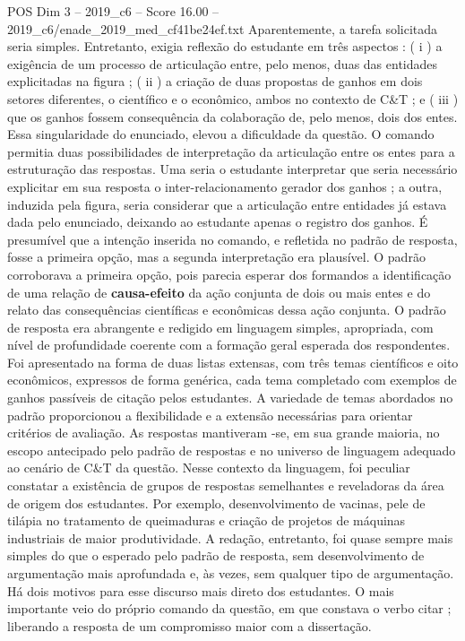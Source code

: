 \begin{textsample}{POS Dim 3 – 2019\_c6 – Score 16.00 – 2019\_c6/enade\_2019\_med\_cf41be24ef.txt}
Aparentemente, a tarefa solicitada seria simples.
Entretanto, exigia reflexão do estudante em três aspectos : ( i ) a exigência de um processo de articulação entre, pelo menos, duas das entidades explicitadas na figura ; ( ii ) a criação de duas propostas de ganhos em dois setores diferentes, o científico e o econômico, ambos no contexto de C\&T ; e ( iii ) que os ganhos fossem consequência da colaboração de, pelo menos, dois dos entes.
Essa singularidade do enunciado, elevou a dificuldade da questão.
O comando permitia duas possibilidades de interpretação da articulação entre os entes para a estruturação das respostas.
Uma seria o estudante interpretar que seria necessário explicitar em sua resposta o inter-relacionamento gerador dos ganhos ; a outra, induzida pela figura, seria considerar que a articulação entre entidades já estava dada pelo enunciado, deixando ao estudante apenas o registro dos ganhos.
É presumível que a intenção inserida no comando, e refletida no padrão de resposta, fosse a primeira opção, mas a segunda interpretação era plausível.
O padrão corroborava a primeira opção, pois parecia esperar dos formandos a identificação de uma relação de \textbf{causa-efeito} da ação conjunta de dois ou mais entes e do relato das consequências científicas e econômicas dessa ação conjunta.
O padrão de resposta era abrangente e redigido em linguagem simples, apropriada, com nível de profundidade coerente com a formação geral esperada dos respondentes.
Foi apresentado na forma de duas listas extensas, com três temas científicos e oito econômicos, expressos de forma genérica, cada tema completado com exemplos de ganhos passíveis de citação pelos estudantes.
A variedade de temas abordados no padrão proporcionou a flexibilidade e a extensão necessárias para orientar critérios de avaliação.
As respostas mantiveram -se, em sua grande maioria, no escopo antecipado pelo padrão de respostas e no universo de linguagem adequado ao cenário de C\&T da questão.
Nesse contexto da linguagem, foi peculiar constatar a existência de grupos de respostas semelhantes e reveladoras da área de origem dos estudantes.
Por exemplo, desenvolvimento de vacinas, pele de tilápia no tratamento de queimaduras e criação de projetos de máquinas industriais de maior produtividade.
A redação, entretanto, foi quase sempre mais simples do que o esperado pelo padrão de resposta, sem desenvolvimento de argumentação mais aprofundada e, às vezes, sem qualquer tipo de argumentação.
Há dois motivos para esse discurso mais direto dos estudantes.
O mais importante veio do próprio comando da questão, em que constava o verbo citar ; liberando a resposta de um compromisso maior com a dissertação.

\end{textsample}
